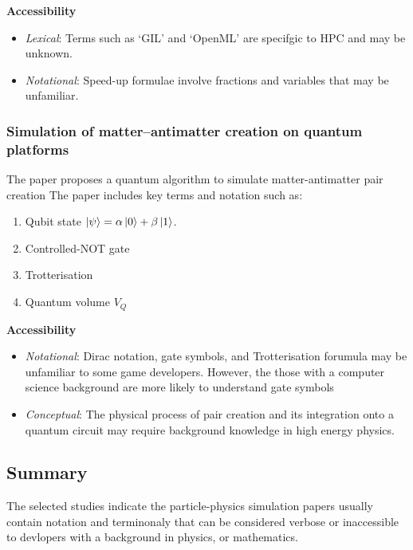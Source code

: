 \textbf{Accessibility}

\begin{itemize}
    \item \emph{Lexical}: Terms such as `GIL' and `OpenML' are specifgic to HPC and may be unknown.
    \item \emph{Notational}: Speed-up formulae involve fractions and variables that may be unfamiliar.
\end{itemize}

\subsubsection*{Simulation of matter–antimatter creation on quantum platforms}

The paper  proposes a quantum algorithm to simulate matter-antimatter pair creation
The paper includes key terms and notation such as:

\begin{enumerate}
    \item Qubit state $\ket{\psi} = \alpha\ket{0} + \beta\ket{1}$.
    \item Controlled-NOT gate
    \item Trotterisation
    \item Quantum volume $V_Q$
\end{enumerate}

\textbf{Accessibility}

\begin{itemize}
    \item \emph{Notational}: Dirac notation, gate symbols, and Trotterisation forumula may be unfamiliar to some game developers. However, the those with a computer science background are more likely to understand gate symbols
    \item \emph{Conceptual}: The physical process of pair creation and its integration onto a quantum circuit may require background knowledge in high energy physics.
\end{itemize}

\subsection{Summary}

The selected studies indicate the particle-physics simulation papers usually contain notation and terminonaly that can be considered verbose or inaccessible to devlopers with a background in
physics, or mathematics.

